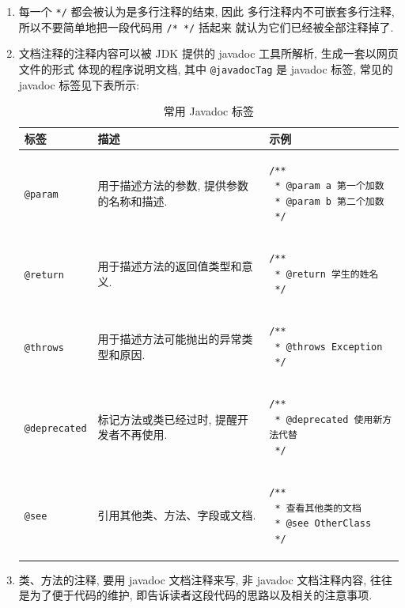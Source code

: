 \documentclass[10pt,UTF8]{book} %
\begin{document}
\begin{enumerate}
    \item 每一个 \lstinline|*/| 都会被认为是多行注释的结束, 因此
    多行注释内不可嵌套多行注释, 所以不要简单地把一段代码用 \lstinline|/* */| 括起来
    就认为它们已经被全部注释掉了.
    \item 文档注释的注释内容可以被 JDK 提供的 javadoc 工具所解析, 生成一套以网页文件的形式
    体现的程序说明文档, 其中 \lstinline|@javadocTag| 是 javadoc 标签, 常见的 javadoc
    标签见下表所示:
    \begin{table}[H]
        \centering
        \caption{常用 Javadoc 标签}
        \begin{tabular}{p{2.5cm} p{5cm} p{7cm}}
            \hline
            \textbf{标签} & \textbf{描述} & \textbf{示例} \\
            \hline
            \lstinline|@param| & 用于描述方法的参数, 提供参数的名称和描述.  & 
            \begin{lstlisting}
/**
 * @param a 第一个加数
 * @param b 第二个加数
 */
            \end{lstlisting} \\
                              \hline
            \lstinline|@return| & 用于描述方法的返回值类型和意义.  & 
            \begin{lstlisting}
/**
 * @return 学生的姓名
 */
            \end{lstlisting} \\
                              \hline
            \lstinline|@throws| & 用于描述方法可能抛出的异常类型和原因.  & 
            \begin{lstlisting}
/**
 * @throws Exception
 */
            \end{lstlisting} \\
                              \hline
            \lstinline|@deprecated| & 标记方法或类已经过时, 提醒开发者不再使用.  & 
            \begin{lstlisting}
/**
 * @deprecated 使用新方法代替
 */
            \end{lstlisting} \\
                                    \hline
            \lstinline|@see| & 引用其他类、方法、字段或文档.  & 
            \begin{lstlisting}
/**
 * 查看其他类的文档
 * @see OtherClass
 */
            \end{lstlisting} \\
                           \hline
        \end{tabular}
        \label{tab:javadoc-tags}
    \end{table}
    \item 类、方法的注释, 要用 javadoc 文档注释来写, 非 javadoc 文档注释内容,
    往往是为了便于代码的维护, 即告诉读者这段代码的思路以及相关的注意事项.
\end{enumerate}
\end{document}
